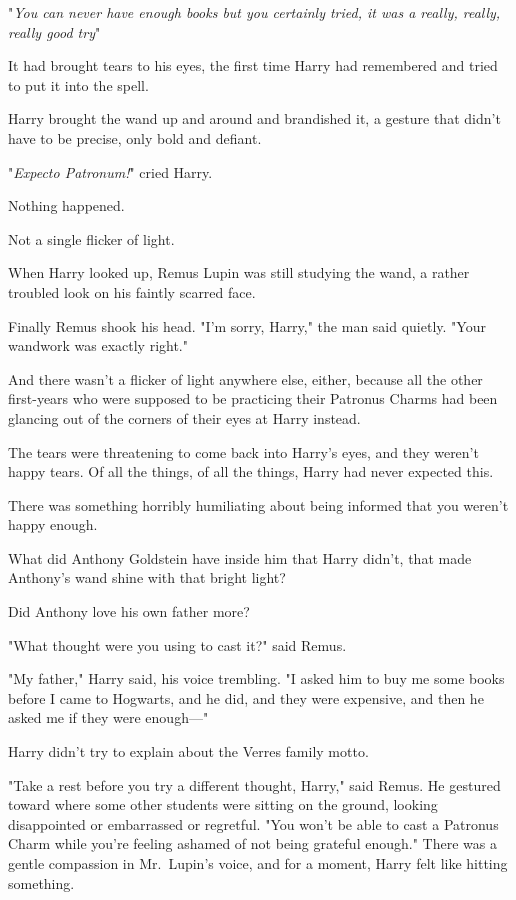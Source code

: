 "\emph{You can never have enough books{\el} but you certainly tried, it was
a really, really, really good try{\el}}"

It had brought tears to his eyes, the first time Harry had remembered and tried
to put it into the spell.

Harry brought the wand up and around and brandished it, a gesture that didn't
have to be precise, only bold and defiant.

"\emph{Expecto Patronum!}" cried Harry.

Nothing happened.

Not a single flicker of light.

When Harry looked up, Remus Lupin was still studying the wand, a rather
troubled look on his faintly scarred face.

Finally Remus shook his head. "I'm sorry, Harry," the man said quietly. "Your
wandwork was exactly right."

And there wasn't a flicker of light anywhere else, either, because all the
other first-years who were supposed to be practicing their Patronus Charms had
been glancing out of the corners of their eyes at Harry instead.

The tears were threatening to come back into Harry's eyes, and they weren't
happy tears. Of all the things, of all the things, Harry had never expected
this.

There was something horribly humiliating about being informed that you weren't
happy enough.

What did Anthony Goldstein have inside him that Harry didn't, that made
Anthony's wand shine with that bright light?

Did Anthony love his own father more?

"What thought were you using to cast it?" said Remus.

"My father," Harry said, his voice trembling. "I asked him to buy me some books
before I came to Hogwarts, and he did, and they were expensive, and then he
asked me if they were enough---"

Harry didn't try to explain about the Verres family motto.

"Take a rest before you try a different thought, Harry," said Remus. He
gestured toward where some other students were sitting on the ground, looking
disappointed or embarrassed or regretful. "You won't be able to cast a Patronus
Charm while you're feeling ashamed of not being grateful enough." There was a
gentle compassion in Mr.~Lupin's voice, and for a moment, Harry felt like
hitting something.

